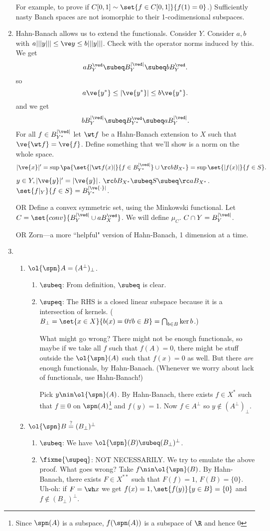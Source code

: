 \begin{enumerate}
For example, to prove if $C[0,1]\sim \set{f\in C[0,1]}{f(1)=0}$.)
Sufficiently nasty Banch spaces are not isomorphic to their 1-codimensional subspaces.
\item  Hahn-Banach allows us to extend the functionals. 
Consider $Y$. Consider $a,b$ with $a|||y|||\le \ve y\le b|||y|||$. Check with the operator norms induced by this. We get 
\[
aB_Y^{\ved}\subeq B_Y^{|\ved|}\subeq bB_Y^{\ved}.
\]
so 
\[
a\ve{y^*}\le |\ve{y^*}|\le b\ve{y^*}.
\]
and we get
\[
bB_Y^{|\ved|}\subeq B_{Y^*}^{\ved}\subeq aB_Y^{|\ved|}.
\]
For all $f\in B_{Y^*}^{|\ved|}$ let $\wt f$ be a Hahn-Banach extension to $X$ such that $\ve{\wt f}=\ve{f}$. 
Define something that we'll show is a norm on the whole space.
\[
|\ve{x}|'=\sup\pa{
\set{|\wt f(x)|}{f\in B_{Y^*}^{|\ved|}}\cup 
\rc bB_{X^*}
}=\sup\set{|f(x)|}{f\in S}.
\]
$y\in Y, |\ve{y}|'=|\ve{y}|$.
$\rc bB_{X^*} \subeq S\subeq \rc a B_{X^*}$. $\set{f|_Y}{f\in S}=B_{Y^*}^{|\ve{\cdot}|}$.

OR Define a convex symmetric set, using the Minkowski functional. Let $C=\set{conv}{B_Y^{|\ved|}\cup aB_X^{\ved}}$. We will define $\mu_C$. $C\cap Y=B_Y^{|\ved|}$. 

OR Zorn---a more ``helpful" version of Hahn-Banach, 1 dimension at a time.
\item 
\begin{enumerate}
\item
$\ol{\spn} A=(A^{\perp})_{\perp}$. 
\begin{enumerate}
\item
$\subeq$: From definition, $\subeq$ is clear.
\item
$\supeq$: 
 The RHS is a closed linear subspace because it is a intersection of kernels. ($B_{\perp}=\set{x\in X}{b(x)=0\forall b\in B}=\bigcap_{b\in B}\ker b$.) 

What might go wrong? There might not be enough functionals, so maybe if we take all $f$ such that $f(A)=0$, there might be stuff outside the $\ol{\spn}(A)$ such that $f(x)=0$ as well. But there {\it are} enough functionals, by Hahn-Banach. (Whenever we worry about lack of functionals, use Hahn-Banach!)

Pick $y\nin \ol{\spn}(A)$. By Hahn-Banach, there exists $f\in X^*$ such that $f\equiv 0$ on $\spn(A)$\footnote{Since $\spn(A)$ is a subspace, $f(\spn(A))$ is  a subspace of $\R$ and hence 0} and $f(y)=1$. Now $f\in A^{\perp}$ so $y\nin (A^{\perp})_{\perp}$. 
\end{enumerate}
\item $\ol{\spn}B\stackrel ?=(B_{\perp})^{\perp}$
\begin{enumerate}
\item
$\subeq$: 
We have $\ol{\spn}(B)\subeq (B_{\perp})^{\perp}$. 
\item
$\fixme{\supeq}$: NOT NECESSARILY. We try to emulate the above proof. What goes wrong? Take $f\nin \ol{\spn}(B)$. By Hahn-Banach, there exists $F\in X^{**}$ such that $F(f)=1$, $ F(B)=\{0\}$. Uh-oh: if $F=\wh x$ we get $f(x)=1,\set{f(y)}{y\in B}=\{0\}$ and $f\nin (B_{\perp})^{\perp}$.


\end{enumerate}
\end{enumerate}
\end{enumerate}
